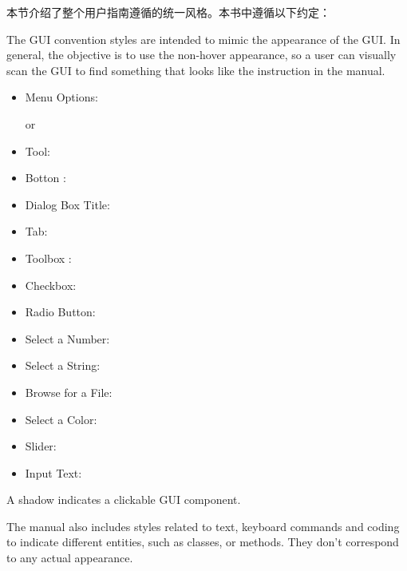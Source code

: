 \label{label_conventions}

本节介绍了整个用户指南遵循的统一风格。本书中遵循以下约定：


The GUI convention styles are intended to mimic the appearance of the GUI. In general, the objective is to use the non-hover appearance, so a user can visually scan the GUI to find something that looks like the instruction in the manual.

\begin{itemize}[label=--,itemsep=5pt]
\item Menu Options:  \arrow
{}

or

 \arrow
{} \arrow {}
\item Tool: 
\item Botton : 
\item Dialog Box Title: 
\item Tab: 

\item Toolbox : 
\item Checkbox: 
\item Radio Button:   
\item Select a Number: 
\item Select a String: 
\item Browse for a File: \browsebutton
\item Select a Color: 
\item Slider: 
\item Input Text: 
\end{itemize}
A shadow indicates a clickable GUI component.


The manual also includes styles related to text, keyboard commands and coding to indicate different entities, such as classes, or methods. They don't correspond to any actual appearance.

